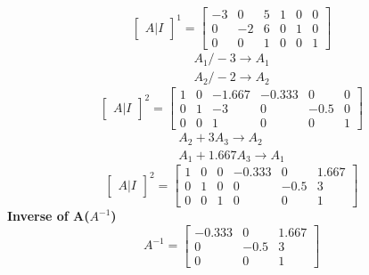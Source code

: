 \documentclass{article}
\begin{document}
\[
\left[
\begin{array}{c|c}
A|I
\end{array}
\right]^1
=
\left[
\begin{array}{ccc|ccc}
   -3 & 0 & 5 & 1 & 0 & 0\\
	0 & -2 & 6 & 0 & 1 & 0\\
	0 & 0 & 1 & 0 & 0 & 1
\end{array}
\right]
\]
\begin{align}
	A_{1}/-3\rightarrow A_{1}\\
	A_{2}/-2\rightarrow A_{2}
\end{align}
\[
\left[
\begin{array}{c|c}
A|I
\end{array}
\right]^2
=
\left[
\begin{array}{ccc|ccc}
    1 & 0 & -1.667 & -0.333 & 0 & 0\\
	0 & 1 & -3 & 0 & -0.5 & 0\\
	0 & 0 & 1 & 0 & 0 & 1
\end{array}
\right]
\]
\begin{align}
	A_{2}+3A_{3}\rightarrow A_{2}\\
	A_{1}+1.667A_{3}\rightarrow A_{1}
\end{align}
\[
\left[
\begin{array}{c|c}
A|I
\end{array}
\right]^2
=
\left[
\begin{array}{ccc|ccc}
    1 & 0 & 0 & -0.333 & 0 & 1.667\\
	0 & 1 & 0 & 0 & -0.5 & 3\\
	0 & 0 & 1 & 0 & 0 & 1
\end{array}
\right]
\]
\textbf{Inverse of A($A^{-1}$)}
\[
A^{-1}
=
\begin{bmatrix}
	-0.333 & 0 & 1.667\\
	 0 & -0.5 & 3\\
	 0 & 0 & 1
\end{bmatrix}
\]
\end{document}
